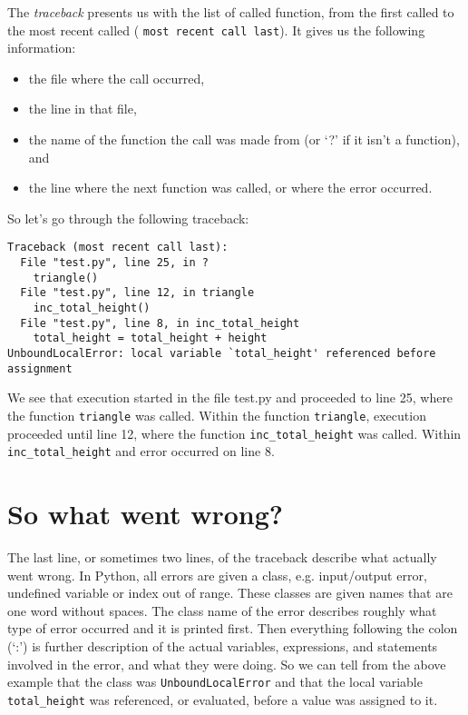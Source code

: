 The \textit{traceback} presents us with the list of called function, from the first called to   the most recent called (
\texttt{most recent call last}). It gives us the following information:                 
\begin{itemize}
	\item the file where the call occurred,
	\item the line in that file,
	\item the name of the function the call was made from (or `?' if it isn't a function), and
	\item the line where the next function was called, or where the error occurred.
\end{itemize}                 So let's go through the following traceback:
\begin{lstlisting}
Traceback (most recent call last):
  File "test.py", line 25, in ?
    triangle()
  File "test.py", line 12, in triangle
    inc_total_height()
  File "test.py", line 8, in inc_total_height
    total_height = total_height + height
UnboundLocalError: local variable `total_height' referenced before assignment
\end{lstlisting}

We see that execution started in the file test.py and proceeded to   line 25, where the function \texttt{triangle} was called. Within the function   \texttt{triangle}, execution proceeded until line 12, where the function   \texttt{inc\_total\_height} was called. Within \texttt{inc\_total\_height} and error   occurred on line 8.

\section{So what went wrong?}

The last line, or sometimes two lines, of the traceback describe   what actually went wrong. In Python, all errors are given a class, e.g.   input/output error, undefined variable or index out of range.   These classes are given names that are one word without spaces.                  The class name of the error describes roughly what type of   error occurred and it is printed first. Then everything following the   colon (`:') is further description of the actual variables,   expressions, and statements involved in the error, and what they were   doing. So we can tell from the above example that the class was   \texttt{UnboundLocalError} and that the local variable \texttt{total\_height} was   referenced, or evaluated, before a value was assigned to it.

